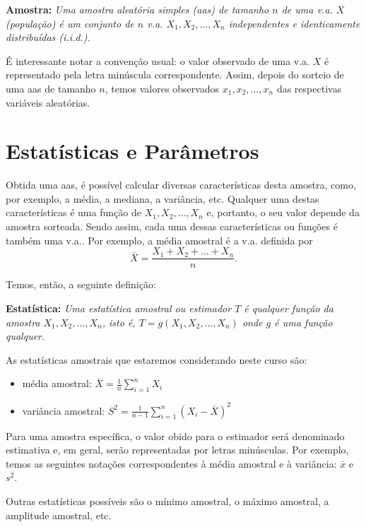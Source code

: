 \documentclass[
]{book}
\providecommand{\tightlist}{%
  \setlength{\itemsep}{0pt}\setlength{\parskip}{0pt}}
\begin{document}
\textbf{Amostra:} \emph{Uma amostra aleatória simples (aas) de tamanho $n$ de uma v.a. $X$ (população) é um conjunto de $n$ v.a. $X_1, X_2, \ldots, X_n$ independentes e identicamente
distribuídas (i.i.d.).}

É interessante notar a convenção usual: o valor observado de uma v.a. \(X\) é representado pela letra minúscula correspondente. Assim, depois do sorteio de uma aas de tamanho \(n\), temos valores observados \(x_1, x_2, \ldots, x_n\) das respectivas variáveis aleatórias.

\hypertarget{estatuxedsticas-e-paruxe2metros}{%
\section{Estatísticas e Parâmetros}\label{estatuxedsticas-e-paruxe2metros}}

Obtida uma aas, é possível calcular diversas características desta amostra, como, por exemplo, a média, a mediana, a variância, etc. Qualquer uma destas características é uma função de \(X_1, X_2, \ldots, X_n\) e, portanto, o seu valor depende da amostra sorteada. Sendo assim, cada uma dessas características ou funções é também uma v.a.. Por exemplo, a média amostral é a v.a. definida por \[\bar X = \frac{X_1+X_2+\ldots+X_n}{n}.\]

Temos, então, a seguinte definição:

\textbf{Estatística:} \emph{Uma estatística amostral ou estimador $T$ é qualquer função da
amostra $X_1, X_2, \ldots, X_n$, isto é, $T = g(X_1, X_2, \ldots, X_n)$ onde $g$ é uma função qualquer.}

As estatísticas amostrais que estaremos considerando neste curso são:

\begin{itemize}
\tightlist
\item
  média amostral: \(\bar X = \frac{1}{n}\sum_{i=1}^n X_i\)
\item
  variância amostral: \(S^2=\frac{1}{n-1}\sum_{i=1}^n (X_i-\bar X)^2\)
\end{itemize}

Para uma amostra específica, o valor obido para o estimador será denominado estimativa e, em geral, serão representadas por letras minúsculas. Por exemplo, temos as seguintes notações correspondentes à média amostral e à variância: \(\bar x\) e \(s^2\).

Outras estatísticas possíveis são o mínimo amostral, o máximo amostral, a amplitude amostral, etc.
\end{document}
